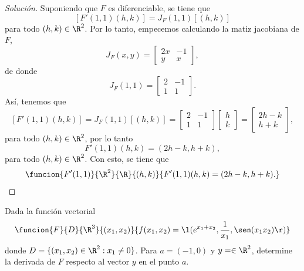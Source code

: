 \documentclass[a4,11pt]{aleph-notas}
\begin{document}
\begin{proof}[Solución]
Suponiendo que $F$ es diferenciable, se tiene que
    \[
        [F'(1,1)(h,k)] = J_F(1,1) [(h,k)]
    \]
    para todo $(h,k)\in\R^2$. Por lo tanto, empecemos calculando la matiz jacobiana de $F$,
    \[
        J_F(x,y)=
            \begin{bmatrix}
                2x  & -1\\
                y   & x
            \end{bmatrix},
    \]
    de donde
    \[
        J_F(1,1)=
            \begin{bmatrix}
                2  & -1\\
                1   & 1
            \end{bmatrix}.
    \]
    Así, tenemos que
    \[
        [F'(1,1)(h,k)] 
            = J_F(1,1) [(h,k)]
            = \begin{bmatrix}
                2  & -1\\
                1   & 1
            \end{bmatrix}
            \begin{bmatrix}
                h \\
                k 
            \end{bmatrix}
            = \begin{bmatrix}
                2h - k \\
                h + k 
            \end{bmatrix},
    \]
    para todo $(h,k)\in\R^2$, por lo tanto
    \[
        F'(1,1)(h,k) = (2h - k,h + k),
    \]
    para todo $(h,k)\in\R^2$. Con esto, se tiene que
    \[
        \funcion{F'(1,1)}{\R^2}{\R}{(h,k)}{F'(1,1)(h,k) = (2h - k,h + k).}
        \qedhere
    \]
\end{proof}

\begin{ejer}
Dada la función vectorial 
    \[
        \funcion{F}{D}{\R^3}{(x_1,x_2)}{f(x_1,x_2)=\l(e^{x_1+x_2},\frac{1}{x_1},\sen(x_1x_2)\r)}
    \]
    donde $D=\{(x_1,x_2)\in\R^2:x_1\neq 0\}$. Para $a=(-1,0)$ y $y=\in\R^2$, determine la derivada de $F$ respecto al vector $y$ en el punto $a$.
\end{ejer}
\end{document}
